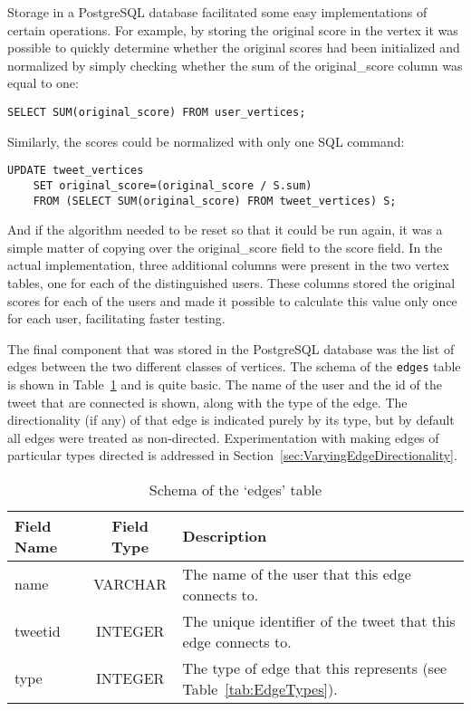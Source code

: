 Storage in a PostgreSQL database facilitated some easy implementations of certain operations. For example, by storing the original score in the vertex it was possible to quickly determine whether the original scores had been initialized and normalized by simply checking whether the sum of the original\_score column was equal to one:

\begin{verbatim}
SELECT SUM(original_score) FROM user_vertices;
\end{verbatim}

\noindent
Similarly, the scores could be normalized with only one SQL command:

\begin{verbatim}
UPDATE tweet_vertices
    SET original_score=(original_score / S.sum)
    FROM (SELECT SUM(original_score) FROM tweet_vertices) S;
\end{verbatim}

\noindent
And if the algorithm needed to be reset so that it could be run again, it was a simple matter of copying over the original\_score field to the score field. In the actual implementation, three additional columns were present in the two vertex tables, one for each of the distinguished users. These columns stored the original scores for each of the users and made it possible to calculate this value only once for each user, facilitating faster testing.

The final component that was stored in the PostgreSQL database was the list of edges between the two different classes of vertices. The schema of the \texttt{edges} table is shown in Table~\ref{tab:edgesSchema} and is quite basic. The name of the user and the id of the tweet that are connected is shown, along with the type of the edge. The directionality (if any) of that edge is indicated purely by its type, but by default all edges were treated as non-directed. Experimentation with making edges of particular types directed is addressed in Section~\ref{sec:VaryingEdgeDirectionality}.


\begin{table}
\centering
\begin{tabular}{l|c|p{8cm}}
{\bf Field Name} & {\bf Field Type} & {\bf Description} \\ \hline
name & VARCHAR & The name of the user that this edge connects to. \\ \hline
tweetid & INTEGER & The unique identifier of the tweet that this edge connects to. \\ \hline
type & INTEGER & The type of edge that this represents (see Table~\ref{tab:EdgeTypes}). \\
\end{tabular}
\caption{Schema of the `edges' table}
\label{tab:edgesSchema}
\end{table}


